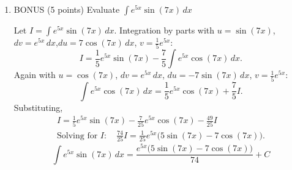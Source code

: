\documentclass[12pt]{article}
\newcommand{\ds}{\displaystyle}
\begin{document}
\begin{enumerate}
\item BONUS (5 points) Evaluate $\ds \int e^{5x} \sin(7x) \, dx$
  \begin{solution}
    Let $I = \int e^{5x}\sin(7x)\,dx$. Integration by parts with $u = \sin(7x)$,
    $dv = e^{5x}\,dx$,\newline $du = 7\cos(7x)\,dx$, $v = \tfrac15 e^{5x}$:
    \[
      I = \frac15 e^{5x}\sin(7x) - \frac75\int e^{5x}\cos(7x)\,dx.
    \]
    Again with $u = \cos(7x)$, $dv = e^{5x}\,dx$, $du = -7\sin(7x)\,dx$, $v = \tfrac15 e^{5x}$:
    \[
      \int e^{5x}\cos(7x)\,dx = \frac15 e^{5x}\cos(7x) + \frac75 I.
    \]
    Substituting,
    \begin{gather*}
      I = \frac15 e^{5x}\sin(7x) - \frac{7}{25} e^{5x}\cos(7x) - \frac{49}{25} I \\[4pt]
      \text{Solving for } I:\quad
      \frac{74}{25} I = \frac{1}{25}e^{5x}\big(5\sin(7x) - 7\cos(7x)\big).
    \end{gather*}
    \[
      \boxed{\int e^{5x}\sin(7x)\,dx = \frac{e^{5x}\big(5\sin(7x) - 7\cos(7x)\big)}{74} + C}
    \]
  \end{solution}


\end{enumerate}
\end{document}
